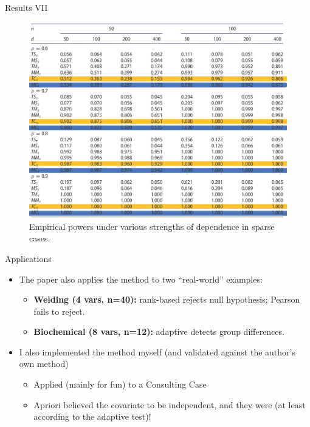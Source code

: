 \documentclass[
  ignorenonframetext,
]{beamer}
\providecommand{\tightlist}{%
  \setlength{\itemsep}{0pt}\setlength{\parskip}{0pt}}
\begin{document}
\begin{frame}{Results VII}
\label{results-vii}
\begin{figure}

{\centering \includegraphics[width=0.8\linewidth]{Figures/Table5H} 

}

\caption{Empirical powers under various strengths of dependence in sparse cases.}\label{fig:Table 5}
\end{figure}
\end{frame}

\begin{frame}{Applications}
\label{applications}
\begin{itemize}
\tightlist
\item
  The paper also applies the method to two ``real-world'' examples:

  \begin{itemize}
  \tightlist
  \item
    \textbf{Welding (4 vars, n=40):} rank-based rejects null hypothesis;
    Pearson fails to reject.
  \item
    \textbf{Biochemical (8 vars, n=12):} adaptive detects group
    differences.
  \end{itemize}
\item
  I also implemented the method myself (and validated against the
  author's own method)

  \begin{itemize}
  \tightlist
  \item
    Applied (mainly for fun) to a Consulting Case
  \item
    Apriori believed the covariate to be independent, and they were (at
    least according to the adaptive test)!
  \end{itemize}
\end{itemize}
\end{frame}
\end{document}
